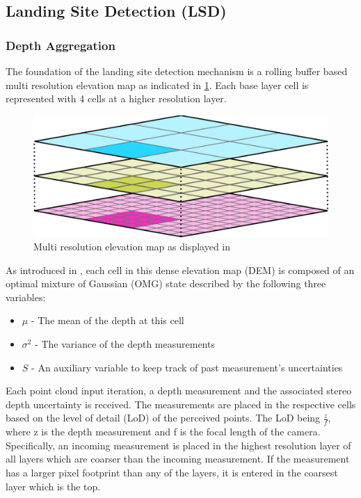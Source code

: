 \subsection{Landing Site Detection (LSD)}\label{subsec:setup:LSD}

\subsubsection{Depth Aggregation}\label{subsubsec:setup:aggregation}

The foundation of the landing site detection mechanism is a rolling buffer based multi resolution elevation map as indicated in \cref{fig:DEM}. Each base layer cell is represented with 4 cells at a higher resolution layer.

\begin{figure}[ht!]
    \centering
    \includegraphics[scale=0.25]{images/system_overview/DEM.png}
    \caption{Multi resolution elevation map as displayed in \citep{LSD1}}
    \label{fig:DEM}
\end{figure}

As introduced in \citet{LSD2}, each cell in this dense elevation map (DEM) is composed of an optimal mixture of Gaussian (OMG) state described by the following three variables:

\begin{itemize}
    \item $\mu$ - The mean of the depth at this cell
    \item $\sigma^2$ - The variance of the depth measurements
    \item $S$ - An auxiliary variable to keep track of past measurement's uncertainties
\end{itemize}

Each point cloud input iteration, a depth measurement and the associated stereo depth uncertainty is received. The measurements are placed in the respective cells based on the level of detail (LoD) of the perceived points. The LoD being $\frac{z}{f}$, where z is the depth measurement and f is the focal length of the camera. Specifically, an incoming measurement is placed in the highest resolution layer of all layers which are coarser than the incoming measurement. If the measurement has a larger pixel footprint than any of the layers, it is entered in the coarsest layer which is the top.

